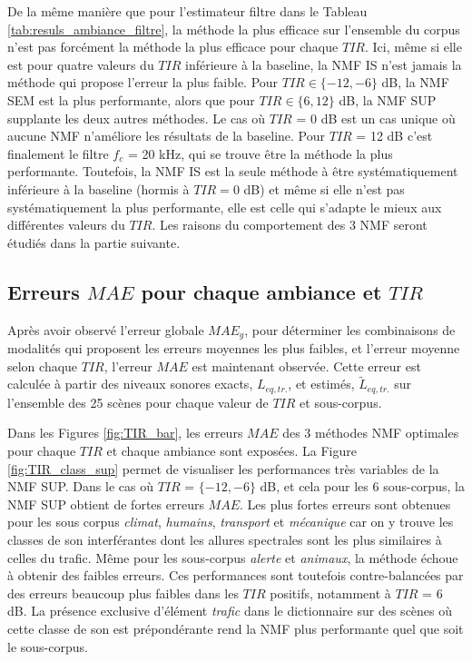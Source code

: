 De la même manière que pour l'estimateur filtre dans le Tableau \ref{tab:resuls_ambiance_filtre}, la méthode la plus efficace sur l'ensemble du corpus n'est pas forcément la méthode la plus efficace pour chaque $TIR$. Ici, même si elle est pour quatre valeurs du $TIR$ inférieure à la baseline, la NMF IS n'est jamais la méthode qui propose l'erreur la plus faible. Pour $TIR \in \lbrace -12, -6 \rbrace$ dB, la NMF SEM est la plus performante, alors que pour $TIR\in \lbrace 6, 12 \rbrace$ dB, la NMF SUP supplante les deux autres méthodes.
Le cas où $TIR$ = 0 dB est un cas unique où aucune NMF n'améliore les résultats de la baseline. Pour $TIR$ = 12 dB c'est finalement le filtre $f_c$ = 20 kHz, qui se trouve être la méthode la plus performante. Toutefois, la NMF IS est la seule méthode à être systématiquement inférieure à la baseline (hormis à $TIR = 0$ dB) et même si elle n'est pas systématiquement la plus performante, elle est celle qui s'adapte le mieux aux différentes valeurs du $TIR$. Les raisons du comportement des 3 NMF seront étudiés dans la partie suivante. \\


\subsection{Erreurs $MAE$ pour chaque ambiance et $TIR$}
Après avoir observé l'erreur globale $MAE_g$, pour déterminer les combinaisons de modalités qui proposent les erreurs moyennes les plus faibles, et l'erreur moyenne selon chaque $TIR$, l'erreur $MAE$ est maintenant observée. Cette erreur est calculée à partir des niveaux sonores exacts, $L_{eq,tr.}$, et estimés, $\tilde{L}_{eq,tr.}$ sur l'ensemble des 25 scènes pour chaque valeur de $TIR$ et sous-corpus.

Dans les Figures \ref{fig:TIR_bar}, les erreurs $MAE$ des 3 méthodes NMF optimales pour chaque $TIR$ et chaque ambiance sont exposées. La Figure \ref{fig:TIR_class_sup} permet de visualiser les performances très variables de la NMF SUP. Dans le cas où $TIR$ = $\lbrace -12, -6 \rbrace$ dB, et cela pour les 6 sous-corpus, la NMF SUP obtient de fortes erreurs $MAE$. Les plus fortes erreurs sont obtenues pour les sous corpus \textit{climat}, \textit{humains}, \textit{transport} et \textit{mécanique} car on y trouve les classes de son interférantes dont les allures spectrales sont les plus similaires à celles du trafic.
Même pour les sous-corpus \textit{alerte} et \textit{animaux}, la méthode échoue à obtenir des faibles erreurs. Ces performances sont toutefois contre-balancées par des erreurs beaucoup plus faibles dans les $TIR$ positifs, notamment à $TIR$ = 6 dB. La présence exclusive d'élément \textit{trafic} dans le dictionnaire sur des scènes où cette classe de son est prépondérante rend la NMF plus performante quel que soit le sous-corpus.

